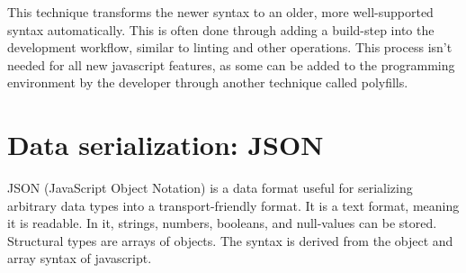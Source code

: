 This technique transforms the newer syntax to an older, more well-supported syntax automatically. This is often done through adding a build-step into the development workflow, similar to linting and other operations. This process isn't needed for all new javascript features, as some can be added to the programming environment by the developer through another technique called polyfills. \cite[p. 4-5]{youdontknowjs}

\section{Data serialization: JSON}

JSON (JavaScript Object Notation) is a data format useful for serializing arbitrary data types into a transport-friendly format. It is a text format, meaning it is readable. In it, strings, numbers, booleans, and null-values can be stored. Structural types are arrays of objects. The syntax is derived from the object and array syntax of javascript. \cite{json}

